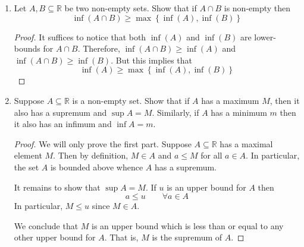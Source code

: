\documentclass[12pt, reqno]{article}
\numberwithin{equation}{section}
\theoremstyle{definition}
\theoremstyle{remark}
\newcommand{\NN}{\mathbb{N}}
\newcommand{\RR}{\mathbb{R}}
\newcommand{\set}[1]{\left\{#1\right\}}
\begin{document}
\begin{enumerate}[leftmargin=*]
\begin{proof}
		      By the previous problem, there exists $k\in \NN$ such that
		      \[
			      \frac{1}{2^k} < y-x
		      \]
		      Consider now the set
		      \[
			      A = \set{n \in \NN : \frac{n}{2^k} > x}
		      \]
		      By the Archimedean property, there exists $N\in \NN$ such that $N > 2^kx$. It follows that $A$ is non-empty. Thus, the well ordering property of $\NN$ implies that $A$ has a least element $n_0$. We claim that
		      \[
			      x < \frac{n_0}{2^k} < y
		      \]
		      The first inequality follows from the fact that $n_0 \in A$. If $n_0 = 1$ then we are done since
		      \[
			      \frac{n_0}{2^k} = \frac{1}{2^k} < y-x < y
		      \]
		      Otherwise, $n_0 \geq 2$ is the least element of $A$. It follows that $n_0 - 1\not\in A$. That is,
		      \[
			      \frac{n_0 - 1}{2^k} \leq x
		      \]
		      Ergo,
		      \[
			      y = x + (y-x) > \frac{n_0 - 1}{2^k}  + \frac{1}{2^k} = \frac{n_0}{2^k}
		      \]
	      \end{proof}

	\item Let $A, B\subseteq \RR$ be two non-empty sets. Show that if $A\cap B$ is non-empty then
	      \[
		      \inf(A\cap B) \geq \max\set{\inf(A), \inf(B)}
	      \]
	      \begin{proof}
		      It suffices to notice that both $\inf(A)$ and $\inf(B)$ are lower-bounds for $A\cap B$. Therefore, $\inf(A\cap B) \geq \inf(A)$ and $\inf(A\cap B) \geq \inf(B)$. But this implies that
		      \[
			      \inf(A) \geq \max\set{\inf(A), \inf(B)}
		      \]
	      \end{proof}

	\item Suppose $A\subseteq \RR$ is a non-empty set. Show that if $A$ has a maximum $M$, then it also has a supremum and $\sup A = M$. Similarly, if $A$ has a minimum $m$ then it also has an infimum and $\inf A = m$.

	      \begin{proof}
		      We will only prove the first part. Suppose $A\subseteq \RR$ has a maximal element $M$. Then by definition, $M\in A$ and $a\leq M$ for all $a\in A$. In particular, the set $A$ is bounded above whence $A$ has a supremum.

		      It remains to show that $\sup A = M$. If $u$ is an upper bound for $A$ then
		      \[
			      a\leq u\qquad\forall a\in A
		      \]
		      In particular, $M\leq u$ since $M\in A$.

		      We conclude that $M$ is an upper bound which is less than or equal to any other upper bound for $A$. That is, $M$ is the supremum of $A$.
	      \end{proof}




\end{enumerate}
\end{document}

